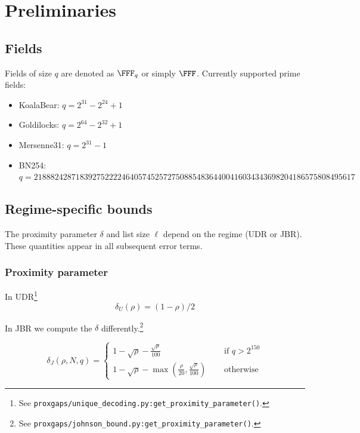 \newpage
\section{Preliminaries}

\subsection{Fields}

Fields of size $q$ are denoted as $\FFF_q$ or simply $\FFF$. Currently supported prime fields:
\begin{itemize}
    \item KoalaBear: $q=2^{31}-2^{24}+1$
    \item Goldilocks: $q=2^{64}-2^{32}+1$
    \item Mersenne31: $q=2^{31}-1$
    \item BN254: $q=21888242871839275222246405745257275088548364400416034343698204186575808495617$
\end{itemize}

\subsection{Regime-specific bounds}

The proximity parameter $\delta$ and list size $\ell$ depend on the regime (UDR or JBR). These quantities appear in all subsequent error terms.

\subsubsection{Proximity parameter}\label{sec:fri_optimal_distance_udr}\label{sec:fri_optimal_distance_jbr}

In UDR\footnote{See \texttt{proxgaps/unique\_decoding.py:get\_proximity\_parameter()}.}
\begin{equation}\label{eq:pp_udr}
    \delta_U(\rho) =(1-\rho)/2
\end{equation}


In JBR we compute the $\delta$ differently.\footnote{See \texttt{proxgaps/johnson\_bound.py:get\_proximity\_parameter()}.}

\begin{equation}\label{eq:pp_jbr}
    \delta_J(\rho,N,q) =\begin{cases}
    1-\sqrt{\rho}-\frac{\sqrt{\rho}}{100}&\quad \text{ if }q>2^{150}\\
    1-\sqrt{\rho}-\max(\frac{\rho}{20},\frac{\sqrt{\rho}}{100})&\quad \text{ otherwise}
    \end{cases}
\end{equation}


